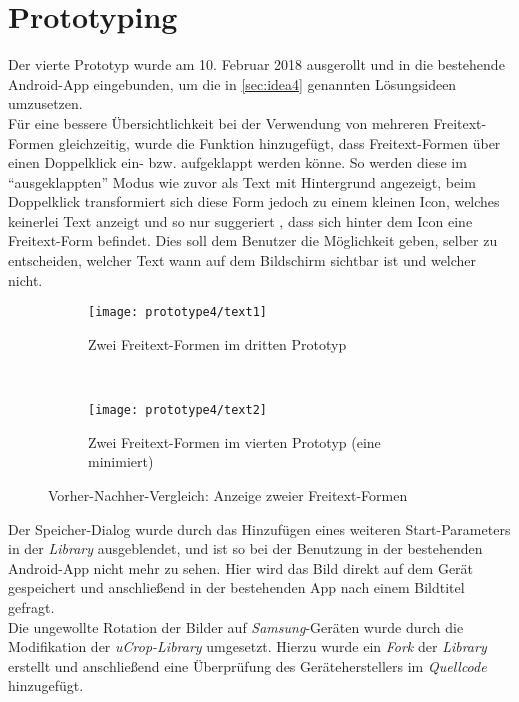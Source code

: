 \section{Prototyping}
Der vierte Prototyp wurde am 10. Februar 2018 ausgerollt und in die bestehende Android-App eingebunden, um die in \autoref{sec:idea4} genannten Lösungsideen umzusetzen. \\

Für eine bessere Übersichtlichkeit bei der Verwendung von mehreren Freitext-Formen gleichzeitig, wurde die Funktion hinzugefügt, dass Freitext-Formen über einen Doppelklick ein- bzw. aufgeklappt werden könne.
So werden diese im ``ausgeklappten'' Modus wie zuvor als Text mit Hintergrund angezeigt, beim Doppelklick transformiert sich diese Form jedoch zu einem kleinen Icon, welches keinerlei Text anzeigt und so nur suggeriert , dass sich hinter dem Icon eine Freitext-Form befindet. 
Dies soll dem Benutzer die Möglichkeit geben, selber zu entscheiden, welcher Text wann auf dem Bildschirm sichtbar ist und welcher nicht. \\

\begin{figure}[h]
  \begin{subfigure}[t]{0.4\textwidth}
    \centering
    \texttt{[image: prototype4/text1]}
    \caption{Zwei Freitext-Formen im dritten Prototyp}
  \end{subfigure}
  ~
  \begin{subfigure}[t]{0.4\textwidth}
    \centering
    \texttt{[image: prototype4/text2]}
    \caption{Zwei Freitext-Formen im vierten Prototyp (eine minimiert)}
  \end{subfigure}
  \centering
  \caption{Vorher-Nachher-Vergleich: Anzeige zweier Freitext-Formen}
  \label{fig:texts}
\end{figure}

Der Speicher-Dialog wurde durch das Hinzufügen eines weiteren Start-Parameters in der \emph{Library} ausgeblendet, und ist so bei der Benutzung in der bestehenden Android-App nicht mehr zu sehen.
Hier wird das Bild direkt auf dem Gerät gespeichert und anschließend in der bestehenden App nach einem Bildtitel gefragt. \\

Die ungewollte Rotation der Bilder auf \emph{Samsung}-Geräten wurde durch die Modifikation der \emph{uCrop-Library} umgesetzt.
Hierzu wurde ein \emph{Fork} der \emph{Library} erstellt und anschließend eine Überprüfung des Geräteherstellers im \emph{Quellcode} hinzugefügt.

